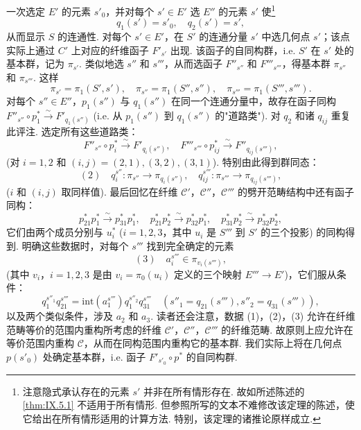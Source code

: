 一次选定 $E'$ 的元素 $s'_0$，并对每个 $s' \in E'$ 选 $E''$ 的元素 $s'$ 使\footnote{注意隐式承认存在的元素 $s'$ 并非在所有情形存在. 故如所述陈述的\cref{thm:IX.5.1} 不适用于所有情形. 但参照所写的文本不难修改该定理的陈述，使它给出在所有情形适用的计算方法. 特别，该定理的诸推论原样成立.}
\[
q_1(s') = s'_0, \quad q_2(s') = s',
\]
从而显示 $S$ 的连通性. 对每个 $s' \in E'$，在 $S'$ 的连通分量 $s'$ 中选几何点 $s'$；该点实际上通过 $C'$ 上对应的纤维函子 $F'_{s'}$ 出现. 该函子的自同构群，i.e. $S'$ 在 $s'$ 处的基本群，记为 $\pi_{s'}$. 类似地选 $s''$ 和 $s'''$，从而选函子 $F''_{s''}$ 和 $F'''_{s'''}$，得基本群 $\pi_{s''}$ 和 $\pi_{s'''}$. 这样
\[
\pi_{s'} = \pi_1(S', s'), \quad \pi_{s''} = \pi_1(S'', s''), \quad \pi_{s'''} = \pi_1(S''', s''').
\]
对每个 $s'' \in E''$，$p_1(s'')$ 与 $q_1(s'')$ 在同一个连通分量中，故存在函子同构 $F''_{s''} \circ p_1^{*} \xrightarrow{\sim} F'_{q_1(s'')}$ (i.e. 从 $p_1(s'')$ 到 $q_1(s'')$ 的"道路类"). 对 $q_2$ 和诸 $q_{ij}$ 重复此评注. 选定所有这些道路类：
\[
F''_{s''} \circ p_i^{*} \xrightarrow{\sim} F'_{q_i(s'')}, \quad F'''_{s'''} \circ p_{ij}^{*} \xrightarrow{\sim} F''_{q_{ij}(s''')},
\]
(对 $i = 1, 2$ 和 $(i, j) = (2, 1), (3, 2), (3, 1)$). 特别由此得到群同态：
\[
(2) \quad q_i^{s''} \colon \pi_{s''} \longrightarrow \pi_{q_i(s'')}, \quad q_{ij}^{s'''} \colon \pi_{s'''} \longrightarrow \pi_{q_{ij}(s''')},
\]
($i$ 和 $(i, j)$ 取同样值). 最后回忆在纤维 $\mathcal{C}'$，$\mathcal{C}''$，$\mathcal{C}'''$ 的劈开范畴结构中还有函子同构：
\[
p_{21}^{*} p_1^{*} \xrightarrow{\sim} p_{31}^{*} p_1^{*}, \quad p_{21}^{*} p_2^{*} \xrightarrow{\sim} p_{32}^{*} p_1^{*}, \quad p_{31}^{*} p_2^{*} \xrightarrow{\sim} p_{32}^{*} p_2^{*},
\]
它们由两个成员分别与 $u_i^{*}$ ($i = 1, 2, 3$，其中 $u_i$ 是 $S'''$ 到 $S'$ 的三个投影) 的同构得到. 明确这些数据时，对每个 $s'''$ 找到完全确定的元素
\[
(3) \quad a_i^{s'''} \in \pi_{v_i(s''')},
\]
(其中 $v_i$，$i = 1, 2, 3$ 是由 $v_i = \pi_0(u_i)$ 定义的三个映射 $E''' \to E'$)，它们服从条件：
\[
q_1^{s''_1} q_{21}^{s'''} = \mathrm{int}(a_1^{s'''}) q_1^{s''_2} q_{31}^{s'''} \quad (s''_1 = q_{21}(s'''), s''_2 = q_{31}(s''')),
\]
以及两个类似条件，涉及 $a_2$ 和 $a_3$. 读者还会注意，数据 (1)，(2)，(3) 允许在纤维范畴等价的范围内重构所考虑的纤维 $\mathcal{C}'$，$\mathcal{C}''$，$\mathcal{C}'''$ 的纤维范畴. 故原则上应允许在等价范围内重构 $\mathcal{C}$，从而在同构范围内重构它的基本群. 我们实际上将在几何点 $p(s'_0)$ 处确定基本群，i.e. 函子 $F'_{s'_0} \circ p^{*}$ 的自同构群.

